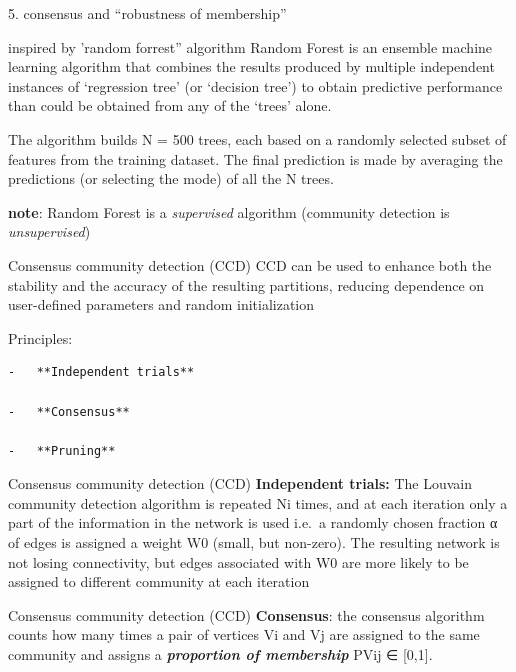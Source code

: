 \documentclass[
  ignorenonframetext,
]{beamer}
\begin{document}
\begin{frame}[fragile]{5. consensus and ``robustness of membership''}
\protect\hypertarget{consensus-and-robustness-of-membership}{}
\begin{block}{inspired by 'random forrest'' algorithm}
\protect\hypertarget{inspired-by-random-forrest-algorithm}{}
Random Forest is an ensemble machine learning algorithm that combines
the results produced by multiple independent instances of `regression
tree' (or `decision tree') to obtain predictive performance than could
be obtained from any of the `trees' alone.

The algorithm builds N = 500 trees, each based on a randomly selected
subset of features from the training dataset. The final prediction is
made by averaging the predictions (or selecting the mode) of all the N
trees.

\textbf{note}: Random Forest is a \emph{supervised} algorithm (community
detection is \emph{unsupervised})
\end{block}

\begin{block}{Consensus community detection (CCD)}
\protect\hypertarget{consensus-community-detection-ccd}{}
CCD can be used to enhance both the stability and the accuracy of the
resulting partitions, reducing dependence on user-defined parameters and
random initialization

Principles:

\begin{verbatim}
-   **Independent trials**

-   **Consensus**

-   **Pruning**
\end{verbatim}
\end{block}

\begin{block}{Consensus community detection (CCD)}
\protect\hypertarget{consensus-community-detection-ccd-1}{}
\textbf{Independent trials:} The Louvain community detection algorithm
is repeated Ni times, and at each iteration only a part of the
information in the network is used i.e.~a randomly chosen fraction α of
edges is assigned a weight W0 (small, but non-zero). The resulting
network is not losing connectivity, but edges associated with W0 are
more likely to be assigned to different community at each iteration
\end{block}

\begin{block}{Consensus community detection (CCD)}
\protect\hypertarget{consensus-community-detection-ccd-2}{}
\textbf{Consensus}: the consensus algorithm counts how many times a pair
of vertices Vi and Vj are assigned to the same community and assigns a
\textbf{\emph{proportion of membership}} PVij ∈ {[}0,1{]}.


\end{block}
\end{frame}
\end{document}
